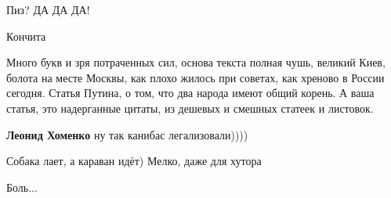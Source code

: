 \begin{itemize}
Пиз? ДА ДА ДА!

 
Кончита

 

Много букв и зря потраченных сил, основа текста полная чушь, великий Киев, болота
на месте Москвы, как плохо жилось при советах, как хреново в России
сегодня. Статья Путина, о том, что два народа имеют общий корень. А ваша статья, это
надерганные цитаты, из дешевых и смешных статеек и листовок.

\begin{itemize}
 
\textbf{Леонид Хоменко} ну так канибас легализовали))))
\end{itemize}

 
Собака лает, а караван идёт)
Мелко, даже для хутора

 
Боль...

 


\end{itemize}
